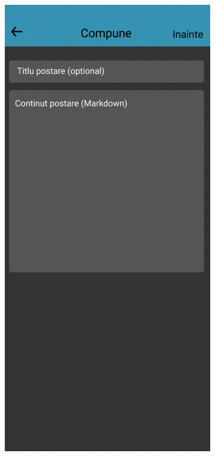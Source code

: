 \begin{figure}[!ht]
    \centering
    \begin{minipage}[b]{0.32\textwidth}
        \captionsetup{justification=centering}
        \includegraphics[width=\textwidth]{figures/app/initial/compose-step-1-draft.png}

\end{minipage}
\end{figure}
